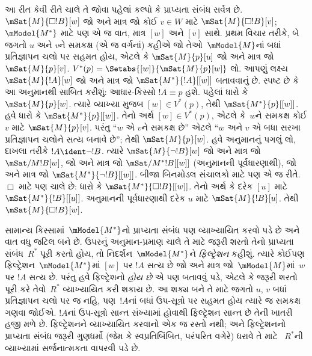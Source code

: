આ રીત કેવી રીતે ચાલે તે જોવા પહેલાં કલ્પો કે પ્રાપ્યતા સંબંધ
સર્વત્ર છે. $\mSat{M}{\Box !B}[w]$ જો અને માત્ર જો કોઈ
$v \in W$ માટે $\mSat{M}{\Box !B}[v]$;~$\mModel{M^*}$ માટે પણ
એ જ વાત, માત્ર $[w]$ અને $[v]$ સાથે.
પ્રથમ વિચાર તરીકે, બે જગતો $u$ અને $v$ને સમકક્ષ (એ જ વર્ગનાં)
કહીએ જો તેઓ~$\mModel{M}$નાં બધાં પ્રતિજ્ઞાપન ચલો
પર સહમત હોય, એટલે કે $\mSat{M}{p}[u]$ જો અને માત્ર જો
$\mSat{M}{p}[v]$. $V^*(p) = \Setabs{[w]}{\mSat{M}{p}[w]}$ લો.
આપણું લક્ષ્ય $\mSat{M}{!A}[w]$ જો અને માત્ર જો
$\mSat{M^*}{!A}[{[w]}]$ બતાવવાનું છે. સ્પષ્ટ છે કે આ અનુમાનથી
સાબિત કરીશું: આધાર-કિસ્સો $!A \equiv p$ હશે. પહેલાં ધારો કે
$\mSat{M}{p}[w]$. ત્યારે વ્યાખ્યા મુજબ $[w] \in V^*(p)$,
તેથી $\mSat{M^*}{p}[{[w]}]$.
હવે ધારો કે $\mSat{M^*}{p}[{[w]}]$. તેનો અર્થ
$[w] \in V^*(p)$, એટલે કે~$w$ને સમકક્ષ કોઈ $v$ માટે
$\mSat{M}{p}[v]$. પરંતુ ``$w$ એ $v$ને સમકક્ષ છે'' એટલે
``$w$ અને $v$ એ બધા સરખા પ્રતિજ્ઞાપન ચલોને સત્ય
બનાવે છે''; તેથી $\mSat{M}{p}[w]$. હવે અનુમાનનું પગલું લો,
દાખલા તરીકે $!A \ident \lnot !B$. ત્યારે
$\mSat{M}{\lnot !B}[w]$ જો અને માત્ર જો $\mSat/{M}{!B}[w]$,
જો અને માત્ર જો $\mSat/{M^*}{!B}[{[w]}]$ (અનુમાનની
પૂર્વધારણાથી), જો અને માત્ર જો
$\mSat{M^*}{\lnot !B}[{[w]}]$. બીજા બિનમોડલ સંચાલકો માટે પણ
એ જ રીતે. $\Box$ માટે પણ ચાલે છે: ધારો કે
$\mSat{M^*}{\Box !B}[{[w]}]$. તેનો અર્થ કે દરેક $[u]$ માટે
$\mSat{M^*}{!B}[{[u]}]$. અનુમાનની પૂર્વધારણાથી દરેક $u$ માટે
$\mSat{M}{!B}[u]$. તેથી $\mSat{M}{\Box !B}[w]$.

સામાન્ય કિસ્સામાં~$\mModel{M^*}$નો પ્રાપ્યતા સંબંધ પણ વ્યાખ્યાયિત
કરવો પડે છે અને વાત વધુ જટિલ બને છે. ઉપરનું અનુમાન-પ્રમાણ ચાલે
તે માટે જરૂરી શરતો તેનો પ્રાપ્યતા સંબંધ~$R^*$ પૂરી કરતો હોય,
તો નિદર્શન~$\mModel{M^*}$ને \emph{ફિલ્ટ્રેશન} કહીશું.
ત્યારે કોઈપણ ફિલ્ટ્રેશન~$\mModel{M^*}$માં $[w]$ પર $!A$
સત્ય છે જો અને માત્ર જો~$\mModel{M}$માં~$w$ પર $!A$ સત્ય છે.
પરંતુ હવે ફિલ્ટ્રેશનો \emph{હોય છે} એ પણ બતાવવું પડે, એટલે કે
જરૂરી શરતો પૂરી કરે તેવો~$R^*$ વ્યાખ્યાયિત કરી શકાય છે.
આ શક્ય બને તે માટે જગતો $u$, $v$ બધાં પ્રતિજ્ઞાપન ચલો
પર જ નહિ, પણ~$!A$નાં બધાં ઉપ-સૂત્રો પર સહમત હોય ત્યારે જ
સમકક્ષ ગણવા જોઈએ. $!A$નાં ઉપ-સૂત્રો સાન્ત સંખ્યામાં હોવાથી
ફિલ્ટ્રેશન સાન્ત છે તેની ખાતરી હજી મળે છે. ફિલ્ટ્રેશનને વ્યાખ્યાયિત
કરવાનો એક જ રસ્તો નથી; અને ફિલ્ટ્રેશનનો પ્રાપ્યતા સંબંધ જરૂરી
ગુણધર્મો (જેમ કે સ્વપ્રતિબિંબિત, પરંપરિત વગેરે) ધરાવે તે માટે
~$R^*$ની વ્યાખ્યામાં સર્જનાત્મકતા વાપરવી પડે છે.
\endgroup

